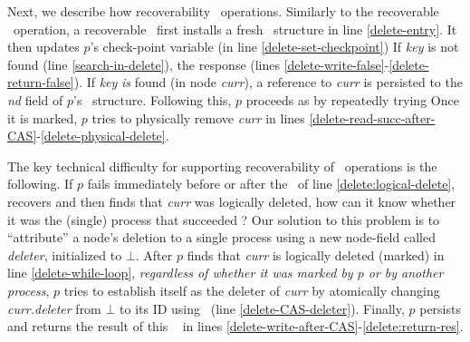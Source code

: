 Next, we describe how recoverability  \delete\ operations. 
Similarly to the recoverable \insertlst\ operation, 
a recoverable \delete\ first installs a fresh \Info\ structure 
in line \ref{delete-entry}. It then updates $p$'s check-point variable 
(in line \ref{delete-set-checkpoint})  
If \emph{key} is not found 
(line \ref{search-in-delete}), the response  (lines \ref{delete-write-false}-\ref{delete-return-false}). 
If \emph{key} \emph{is} found (in node \emph{curr}), 
a reference to \emph{curr} is persisted to the \emph{nd} field of $p$'s \Info\ structure.
Following this, $p$ proceeds as  by repeatedly trying 
Once it is marked, $p$  tries to physically remove \emph{curr} 
in lines \ref{delete-read-succ-after-CAS}-\ref{delete-physical-delete}. 

The key technical difficulty for supporting recoverability of \delete\ operations 
is the following. If $p$ fails immediately before or after the \CAS\ 
of line \ref{delete:logical-delete}, recovers and then finds that \emph{curr}
was logically deleted, how can it know whether it was the (single) process 
that succeeded \y{in deleting \emph{curr}}? Our solution to this problem is 
to ``attribute'' a node's deletion to a single process using a new node-field 
called \emph{deleter}, initialized to $\bot$. After $p$ finds that \emph{curr} 
is logically deleted (marked) in line \ref{delete-while-loop}, 
\emph{regardless of whether it was marked by $p$ or by another process}, 
$p$ tries to establish itself as the deleter of \emph{curr} by atomically 
changing \emph{curr.deleter} from $\bot$ to its ID using \CAS\ 
(line \ref{delete-CAS-deleter}).
Finally, $p$ persists and returns the result of this \CAS\ 
in lines \ref{delete-write-after-CAS}-\ref{delete:return-res}.

